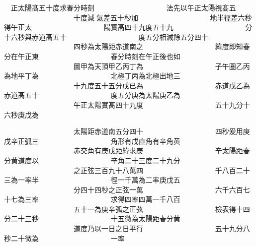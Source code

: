 \begin{正文}
　正太陽髙五十度求春分時刻
　　　　　　　　　　法先以午正太陽視髙五
　　　　　　　　　　十度減𫎇氣差五十秒加
　　　　　　　　　　地半徑差六秒得午正太
　　　　　　　　　　陽實髙四十九度五十九
　　　　　　　　　　分十六秒與赤道髙五十
　　　　　　　　　　度五分相減餘五分四十
　　　　　　　　　　四秒為太陽距赤道南之
　　　　　　　　　　緯度即知春分在午正東
　　　　　　　　　　春分時刻在午正後也如
　　　　　　　　　　圖甲為天頂甲乙丙丁為
　　　　　　　　　　子午圏乙丙為地平丁為
　　　　　　　　　　北極丁丙為北極出地三
　　　　　　　　　　十九度五十五分戊已為
　　　　　　　　　　赤道戊乙為赤道髙五十
　　　　　　　　　　度五分庚為太陽庚乙為
　　　　　　　　　　午正太陽實髙四十九度
　　　　　　　　　　五十九分十六秒庚戊為
\par
\end{正文}\clearpage
{}
\begin{正文}
　　　　　　　　　　太陽距赤道南五分四十
　　　　　　　　　　四秒爰用庚戊辛正弧三
　　　　　　　　　　角形有戊直角有辛角黄
　　　　　　　　　　赤交角有庚戊距緯求庚
　　　　　　　　　　辛太陽距春分黄道度以
　　　　　　　　　　辛角二十三度二十九分
　　　　　　　　　　之正弦三百九十八萬四
　　　　　　　　　　千八百二十三為一率半
　　　　　　　　　　徑一千萬為二率庚戊五
　　　　　　　　　　分四十四秒之正弦一萬
　　　　　　　　　　六千六百七十七為三率
　　　　　　　　　　求得四率四萬一千八百
　　　　　　　　　　五十一為庚辛弧之正弦
　　　　　　　　　　檢表得十四分二十三秒
　　　　　　　　　　十五微為太陽距春分黄
　　　　　　　　　　道度乃以一日之日平行
　　　　　　　　　　五十九分八秒二十微為
　　　　　　　　　　一率
\par
\end{正文}\clearpage
{}

